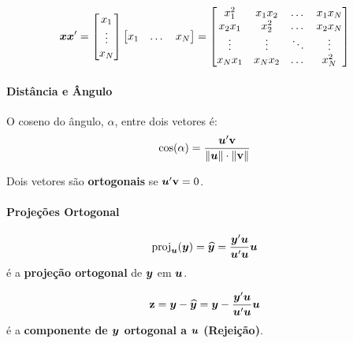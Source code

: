 \documentclass[11pt, oneside, a4paper, article]{article}
\numberwithin{equation}{section}
\begin{document}
\begin{description}
\begin{align}\label{eq:xx:outer}
	\boldsymbol{x} \boldsymbol{x}' =
	\begin{bmatrix}
		x_{1} \\ \vdots \\ x_{N}
	\end{bmatrix}
	\begin{bmatrix}
		x_{1} & \dots & x_{N}
	\end{bmatrix}
	=
	\begin{bmatrix}
		x_{1}^{2}  & x_{1} x_{2} & \dots  & x_{1}x_{N} \\
		x_{2}x_{1} & x_{2}^2     & \dots  & x_{2}x_{N} \\
		\vdots     & \vdots      & \ddots & \vdots \\
		x_{N}x_{1} & x_{N} x_{2} & \dots  & x_{N}^{2}
	\end{bmatrix}
\end{align}

\paragraph{Distância e Ângulo}

O coseno do ângulo, $\alpha$, entre dois vetores é:
\begin{align*}
	\cos(\alpha) = \frac{\boldsymbol{u}'\mathbf{v}}{\|\boldsymbol{u} \|\cdot\|\mathbf{v} \|}
\end{align*}

Dois vetores são \textbf{ortogonais} se $\boldsymbol{u}'\mathbf{v} = 0$.

\paragraph{Projeções Ortogonal}

\vspace{-1 em}
\begin{align*}
	\text{proj}_{\boldsymbol{u}}(\boldsymbol{y}) =
	\widehat{\boldsymbol{y}} =
	\frac{\boldsymbol{y}' \boldsymbol{u}}{\boldsymbol{u}'\boldsymbol{u}} \boldsymbol{u}
\end{align*}
é a \textbf{projeção ortogonal} de $\boldsymbol{y}$ em $\boldsymbol{u}$.

\vspace{-1 em}
\begin{align*}
	\mathbf{z} = \boldsymbol{y} - \widehat{\boldsymbol{y}} = \boldsymbol{y} - \frac{\boldsymbol{y}' \boldsymbol{u}}{\boldsymbol{u}'\boldsymbol{u}} \boldsymbol{u}
\end{align*}
é a \textbf{componente de $\boldsymbol{y}$ ortogonal a $\boldsymbol{u}$} \textbf{(Rejeição)}.


\end{description}
\end{document}
